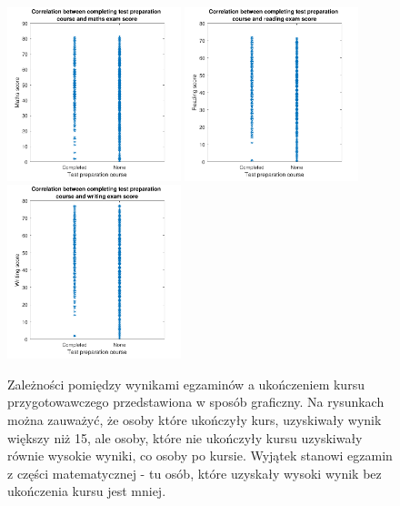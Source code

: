 \documentclass[12pt]{article}
\begin{document}
\begin{figure}[H]
\centering
\includegraphics[width=0.45\textwidth]{korelacja_kurs_egzamin_1.pdf}
\includegraphics[width=0.45\textwidth]{korelacja_kurs_egzamin_2.pdf}
\includegraphics[width=0.45\textwidth]{korelacja_kurs_egzamin_3.pdf}
\caption{Zależności pomiędzy wynikami egzaminów a ukończeniem kursu przygotowawczego przedstawiona w sposób graficzny. Na rysunkach można zauważyć, że osoby które ukończyły kurs, uzyskiwały wynik większy niż 15, ale osoby, które nie ukończyły kursu uzyskiwały równie wysokie wyniki, co osoby po kursie. Wyjątek stanowi egzamin z części matematycznej - tu osób, które uzyskały wysoki wynik bez ukończenia kursu jest mniej. }
\end{figure}

\pagebreak
\end{document}
